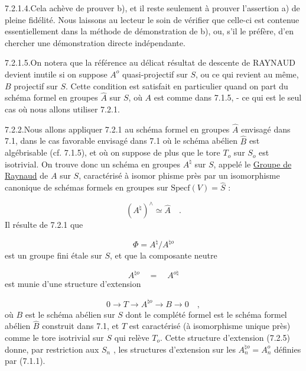 7.2.1.4.\quad Cela achève de prouver b), et il reste seulement à prouver l'assertion a) de pleine fidélité. Nous laissons au lecteur le soin de vérifier que celle-ci est contenue essentiellement dans la méthode de démonstration de b), ou, s'il le préfère, d'en chercher une démonstration directe indépendante.

7.2.1.5.\quad On notera que la référence au délicat résultat de descente de RAYNAUD devient inutile si on suppose $A^{o}$ quasi-projectif sur $S$, ou ce qui revient au même, $B$ projectif sur $S$. Cette condition est satisfait en particulier quand on part du schéma formel en groupes $\hat{A}$ sur $S$, où $A$ est comme dans 7.1.5, - ce qui est le seul cas où nous allons utiliser 7.2.1.

7.2.2.\quad Nous allons appliquer 7.2.1 au schéma formel en groupes $\hat{A}$ envisagé dans 7.1, dans le cas favorable envisagé dans 7.1 où le schéma abélien $\hat{B}$ est algébrisable (cf. 7.1.5), et où on suppose de plus que le tore $T_{o}$ sur $S_{o}$ est isotrivial. On trouve donc un schéma en groupes $A^{\natural}$ sur $S$, appelé le \underline{Groupe de Raynaud} de $A$ sur $S$, caractérisé à isomor%
phisme près par un isomorphisme canonique de schémas formels en groupes sur $\mathrm{Specf}(V) = \hat{S}$ :

\begin{equation}\tag{7.2.3}
(A^{\natural})^{\wedge} \simeq \hat{A} \quad .
\end{equation}
Il résulte de 7.2.1 que

\begin{equation}\tag{7.2.4}
\Phi = A^{\natural}/A^{\natural o}
\end{equation}
est un groupe fini étale sur $S$, et que la composante neutre

\begin{equation*}
A^{\natural o} \quad = \quad A^{o\natural}
\end{equation*}
est munie d'une structure d'extension

\begin{equation}\tag{7.2.5}
0 \longrightarrow T \longrightarrow A^{\natural o} \longrightarrow B \longrightarrow 0 \quad ,
\end{equation}
où $B$ est le schéma abélien sur $S$ dont le complété formel est le schéma formel abélien $\hat{B}$ construit dans 7.1, et $T$ est caractérisé (à isomorphisme unique près) comme le tore isotrivial sur $S$ qui relève $T_{o}$. Cette structure d'extension (7.2.5) donne, par restriction aux $S_{n}$ , les structures d'extension sur les $A_{n}^{\natural o} = A_{n}^{o}$ définies par (7.1.1).


